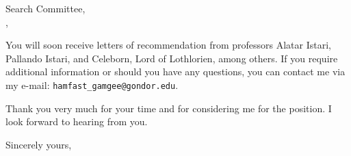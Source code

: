 \documentclass[11pt]{letter} %
\begin{document}
\begin{letter}{
Search Committee,\\
\group,\\
\institution}
 
You will soon receive letters of recommendation from professors Alatar Istari, Pallando Istari, and Celeborn, Lord of Lothlorien, among others. If you require additional information or should you have any questions, you can contact me via my e-mail: \texttt{hamfast\_gamgee@gondor.edu}.
 

Thank you very much for your time and for considering me for the position. I look forward to hearing from you.

\closing{Sincerely yours,}




\end{letter}
\end{document}
